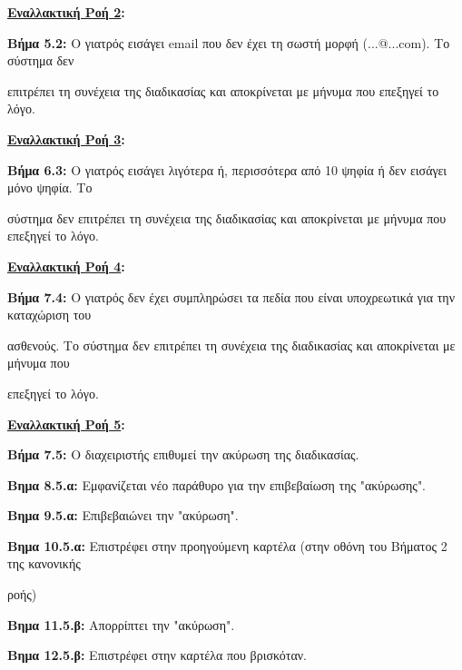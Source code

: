 \documentclass{article}
\begin{document}
\textbf{\underline{Εναλλακτική Ροή 2}:} \vspace{0.2cm}
\par \textbf{Βήμα 5.2:} Ο γιατρός εισάγει email που δεν έχει τη σωστή μορφή (...@...com). Το σύστημα δεν \par επιτρέπει τη συνέχεια της διαδικασίας και αποκρίνεται με μήνυμα που επεξηγεί το λόγο.  \vspace{0.2cm}

\textbf{\underline{Εναλλακτική Ροή 3}:} \vspace{0.2cm}
\par \textbf{Βήμα 6.3:} Ο γιατρός εισάγει λιγότερα ή, περισσότερα από 10 ψηφία ή δεν εισάγει μόνο ψηφία. Το \par σύστημα δεν επιτρέπει τη συνέχεια της διαδικασίας και αποκρίνεται με μήνυμα που επεξηγεί το λόγο.  \vspace{0.2cm}

\textbf{\underline{Εναλλακτική Ροή 4}:} \vspace{0.2cm}
\par \textbf{Βήμα 7.4:} Ο γιατρός δεν έχει συμπληρώσει τα πεδία που είναι υποχρεωτικά για την καταχώριση του \par ασθενούς. Το σύστημα δεν επιτρέπει τη συνέχεια της διαδικασίας και αποκρίνεται με μήνυμα που \par επεξηγεί το λόγο.  \vspace{0.2cm}

\textbf{\underline{Εναλλακτική Ροή 5}:} \vspace{0.2cm}
\par \textbf{Βήμα 7.5:} Ο διαχειριστής επιθυμεί την ακύρωση της διαδικασίας.

\vspace{0.3cm}

\par \textbf{Βημα 8.5.α:} Εμφανίζεται νέο παράθυρο για την επιβεβαίωση της "ακύρωσης". \vspace{0.1cm}
\par \textbf{Βημα 9.5.α:} Επιβεβαιώνει την "ακύρωση". \vspace{0.1cm}
\par \textbf{Βημα 10.5.α:} Επιστρέφει στην προηγούμενη καρτέλα (στην οθόνη του Βήματος 2 της κανονικής \par ροής) \vspace{0.3cm}

\par \textbf{Βημα 11.5.β:}  Απορρίπτει την "ακύρωση". \vspace{0.1cm}
\par \textbf{Βημα 12.5.β:} Επιστρέφει στην καρτέλα που βρισκόταν.
\end{document}

